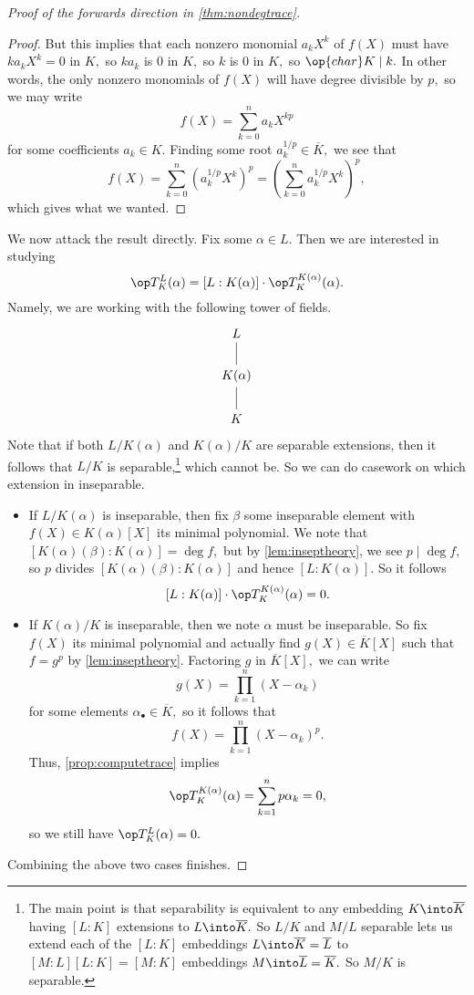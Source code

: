\begin{proof}[Proof of the forwards direction in \autoref{thm:nondegtrace}]
\begin{proof}
		But this implies that each nonzero monomial $a_kX^k$ of $f(X)$ must have $ka_kX^k=0$ in $K,$ so $ka_k$ is $0$ in $K,$ so $k$ is $0$ in $K,$ so $\op{char}K\mid k.$ In other words, the only nonzero monomials of $f(X)$ will have degree divisible by $p,$ so we may write
		\[f(X)=\sum_{k=0}^na_kX^{kp}\]
		for some coefficients $a_k\in K.$ Finding some root $a_k^{1/p}\in\overline K,$ we see that
		\[f(X)=\sum_{k=0}^n\left(a_k^{1/p}X^k\right)^p=\left(\sum_{k=0}^na_k^{1/p}X^k\right)^p,\]
		which gives what we wanted.
	\end{proof}
	We now attack the result directly. Fix some $\alpha\in L.$ Then we are interested in studying
	\[\op T^L_K(\alpha)=[L:K(\alpha)]\cdot\op T_K^{K(\alpha)}(\alpha).\]
	Namely, we are working with the following tower of fields.
	\[\begin{tikzcd}
		L \\
		{K(\alpha)} \\
		K
		\arrow[no head, from=1-1, to=2-1]
		\arrow[no head, from=2-1, to=3-1]
	\end{tikzcd}\]
	Note that if both $L/K(\alpha)$ and $K(\alpha)/K$ are separable extensions, then it follows that $L/K$ is separable,\footnote{The main point is that separability is equivalent to any embedding $K\into\overline K$ having $[L:K]$ extensions to $L\into\overline K.$ So $L/K$ and $M/L$ separable lets us extend each of the $[L:K]$ embeddings $L\into\overline K=\overline L$ to $[M:L][L:K]=[M:K]$ embeddings $M\into\overline L=\overline K.$ So $M/K$ is separable.} which cannot be. So we can do casework on which extension in inseparable.
	\begin{itemize}
		\item If $L/K(\alpha)$ is inseparable, then fix $\beta$ some inseparable element with $f(X)\in K(\alpha)[X]$ its minimal polynomial. We note that $[K(\alpha)(\beta):K(\alpha)]=\deg f,$ but by \autoref{lem:inseptheory}, we see $p\mid\deg f,$ so $p$ divides $[K(\alpha)(\beta):K(\alpha)]$ and hence $[L:K(\alpha)].$ So it follows
		\[[L:K(\alpha)]\cdot\op T_K^{K(\alpha)}(\alpha)=0.\]
		\item If $K(\alpha)/K$ is inseparable, then we note $\alpha$ must be inseparable. So fix $f(X)$ its minimal polynomial and actually find $g(X)\in\overline K[X]$ such that $f=g^p$ by \autoref{lem:inseptheory}. Factoring $g$ in $\overline K[X],$ we can write
		\[g(X)=\prod_{k=1}^n(X-\alpha_k)\]
		for some elements $\alpha_\bullet\in\overline K,$ so it follows that
		\[f(X)=\prod_{k=1}^n(X-\alpha_k)^p.\]
		Thus, \autoref{prop:computetrace} implies
		\[\op T^{K(\alpha)}_K(\alpha)=\sum_{k=1}^np\alpha_k=0,\]
		so we still have $\op T^L_K(\alpha)=0.$
	\end{itemize}
	Combining the above two cases finishes.
\end{proof}

